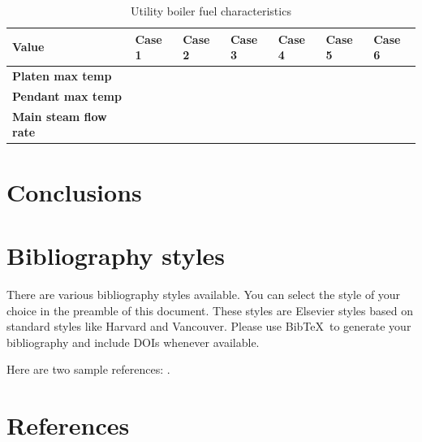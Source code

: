 \documentclass[review]{elsarticle}
\begin{document}
\begin{table}[h!]
\centering
\caption{Utility boiler fuel characteristics}
\vspace{5mm}
\label{fuel}
{\tabulinesep=1.2mm
\begin{tabularx}{\textwidth}{l l l l l l l}
\hline
\textbf{Value} & \textbf{Case 1} & \textbf{Case 2} & \textbf{Case 3}& \textbf{Case 4}&\textbf{Case 5}&\textbf{Case 6}\\
\hline
\textbf{Platen max temp}\\
\textbf{Pendant max temp}\\
\textbf{Main steam flow rate}\\
\hline

\end{tabularx}}
\end{table}


\clearpage


\section{Conclusions}

\section{Bibliography styles}

There are various bibliography styles available. You can select the style of your choice in the preamble of this document. These styles are Elsevier styles based on standard styles like Harvard and Vancouver. Please use Bib\TeX\ to generate your bibliography and include DOIs whenever available.

Here are two sample references: \cite{Feynman1963118,Dirac1953888}.

\section*{References}


\end{document}
